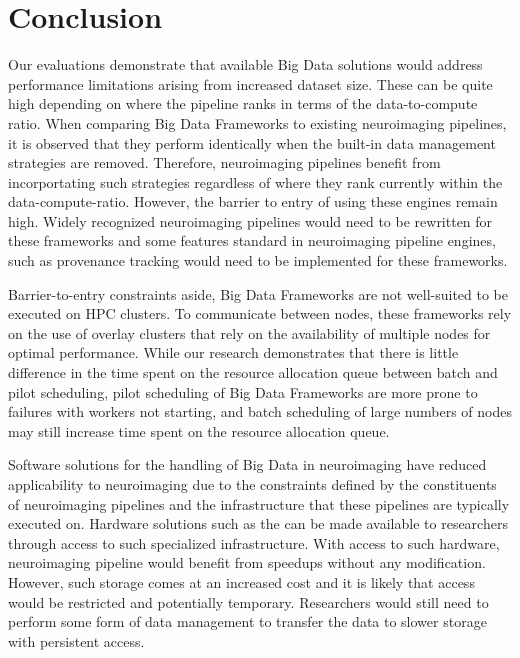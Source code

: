 \chapter{Conclusion}


Our evaluations demonstrate that available Big Data solutions would address performance limitations
arising from increased dataset size. These can be quite high depending on where the pipeline ranks in
terms of the data-to-compute ratio. When comparing Big Data Frameworks to existing neuroimaging pipelines,
it is observed that they perform identically when the built-in data management strategies are removed. Therefore,
neuroimaging pipelines benefit from incorportating such strategies regardless of where they rank currently
within the data-compute-ratio. However, the barrier to entry of using these engines remain high. Widely recognized
neuroimaging pipelines would need to be rewritten for these frameworks and some features standard in neuroimaging pipeline
engines, such as provenance tracking would need to be implemented for these frameworks.

Barrier-to-entry constraints aside, Big Data Frameworks are not well-suited to be executed on HPC clusters. To communicate
between nodes, these frameworks rely on the use of overlay clusters that rely on the availability of multiple nodes for optimal performance.
While our research demonstrates that there is little difference in the time spent on the resource allocation queue between batch and pilot scheduling,
pilot scheduling of Big Data Frameworks are more prone to failures with workers not starting, and batch scheduling of
large numbers of nodes may still increase time spent on the resource allocation queue. 

Software solutions for the handling of Big Data in neuroimaging have reduced applicability to neuroimaging due to the constraints
defined by the constituents of neuroimaging pipelines and the infrastructure that these pipelines are typically executed on. Hardware
solutions such as the \optane can be made available to researchers through access to such specialized infrastructure. With access to such hardware,
neuroimaging pipeline would benefit from speedups without any modification. However, such storage comes at an increased cost and it is likely that 
access would be restricted and potentially temporary. Researchers would still need to perform some form of data management to transfer the data to slower
storage with persistent access.

